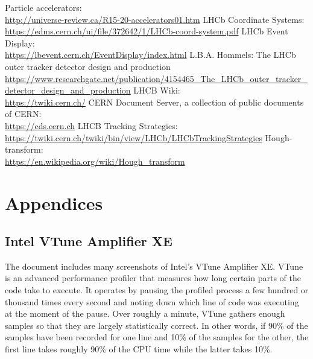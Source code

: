 \documentclass[12pt]{article}
\begin{document}
{\begin{thebibliography}{asd}
		 Particle accelerators:\\
			\url{http://universe-review.ca/R15-20-accelerators01.htm}
		 LHCb Coordinate Systems:\\
			\url{https://edms.cern.ch/ui/file/372642/1/LHCb-coord-system.pdf}
		 LHCb Event Display:\\
			\url{https://lbevent.cern.ch/EventDisplay/index.html}
		 L.B.A. Hommels: The LHCb outer tracker detector design and production\\
			\url{https://www.researchgate.net/publication/4154465_The_LHCb_outer_tracker_detector_design_and_production}
		 LHCB Wiki:\\
			\url{https://twiki.cern.ch/}
		 CERN Document Server, a collection of public documents of CERN:\\
			\url{https://cds.cern.ch}
		 LHCB Tracking Strategies:\\
			\url{https://twiki.cern.ch/twiki/bin/view/LHCb/LHCbTrackingStrategies}
		 Hough-transform:\\
			\url{https://en.wikipedia.org/wiki/Hough_transform}
	\end{thebibliography}
}



\newpage
\section*{Appendices}

\appendix
\renewcommand{\thesubsection}{\Alph{subsection}}

\subsection{Intel VTune Amplifier XE}

The document includes many screenshots of Intel's VTune Amplifier XE. VTune is an advanced performance profiler that measures how long certain parts of the code take to execute. It operates by pausing the profiled process a few hundred or thousand times every second and noting down which line of code was executing at the moment of the pause. Over roughly a minute, VTune gathers enough samples so that they are largely statistically correct. In other words, if 90\% of the samples have been recorded for one line and 10\% of the samples for the other, the first line takes roughly 90\% of the CPU time while the latter takes 10\%.
\vspace{1pc}
\end{document}
